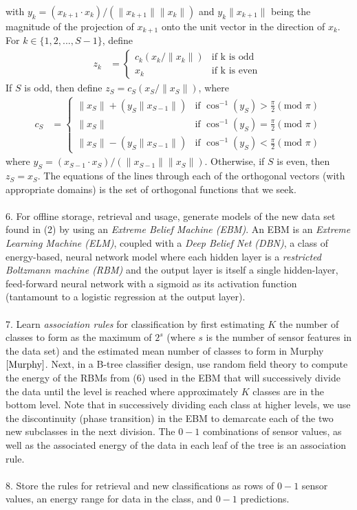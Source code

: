 \documentclass[11pt]{imsart}
\begin{document}
\noindent
with $y_{k} = (x_{k+1} \cdot x_{k})/(\|x_{k+1}\|\|x_{k}\|)$ and $y_{k}\|x_{k+1}\|$ being the magnitude of the projection of $x_{k+1}$ onto the unit vector in the direction of $x_{k}$.  For $k \in \{1,2,...,S-1\}$, define
\begin{align*}
z_{k} &=
\begin{cases}
c_{k}(x_{k}/\|x_{k}\|)	& \text{if k is odd }\\
x_{k}	& \text{if k is even }
\end{cases}
\end{align*}
If $S$ is odd, then define $z_{S}=c_{S}(x_{S}/\|x_{S}\|)$, where
\begin{align*}
c_{S} &=
\begin{cases}
\|x_{S}\|+(y_{S}\|x_{S-1}\|)	& \text{if } \cos^{-1}(y_{S}) > \frac{\pi}{2} (\text{mod } \pi)\\
\|x_{S}\|	& \text{if } \cos^{-1}(y_{S}) = \frac{\pi}{2} (\text{mod } \pi)\\
\|x_{S}\|-(y_{S}\|x_{S-1}\|)	& \text{if } \cos^{-1}(y_{S}) < \frac{\pi}{2} (\text{mod } \pi)
\end{cases}
\end{align*}
where $y_{S} = (x_{S-1} \cdot x_{S})/(\|x_{S-1}\|\|x_{S}\|)$.  Otherwise, if $S$ is even, then $z_{S}=x_{S}$.  The equations of the lines through each of the orthogonal vectors (with appropriate domains) is the set of orthogonal functions that we seek.\\\\
6. For offline storage, retrieval and usage, generate models of the new data set found in (2) by using an \textit{Extreme Belief Machine (EBM)}.  An EBM is an \textit{Extreme Learning Machine (ELM)}, coupled with a \textit{Deep Belief Net (DBN)}, a class of energy-based, neural network model where each hidden layer is a \textit{restricted Boltzmann machine (RBM)} and the output layer is itself a single hidden-layer, feed-forward neural network with a sigmoid as its activation function (tantamount to a logistic regression at the output layer).\\\\
7. Learn \textit{association rules} for classification by first estimating $K$ the number of classes to form as the maximum of $2^{s}$ (where $s$ is the number of sensor features in the data set) and the estimated mean number of classes to form in Murphy $\cite{Murphy}$.  Next, in a B-tree classifier design, use random field theory to compute the energy of the RBMs from (6) used in the EBM that will successively divide the data until the level is reached where approximately $K$ classes are in the bottom level.  Note that in successively dividing each class at higher levels, we use the discontinuity (phase transition) in the EBM to demarcate each of the two new subclasses in the next division.  The $0-1$ combinations of sensor values, as well as the associated energy of the data in each leaf of the tree is an association rule.\\\\
8. Store the rules for retrieval and new classifications as rows of $0-1$ sensor values, an energy range for data in the class, and $0-1$ predictions.
\end{document}
